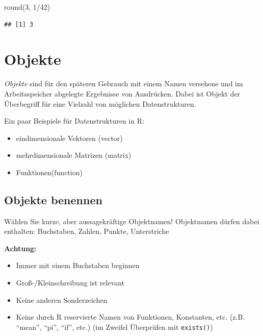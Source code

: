 \documentclass[
]{book}
\newenvironment{Shaded}{\begin{snugshade}}{\end{snugshade}}
\newcommand{\DecValTok}[1]{\textcolor[rgb]{0.00,0.00,0.81}{#1}}
\newcommand{\FunctionTok}[1]{\textcolor[rgb]{0.00,0.00,0.00}{#1}}
\newcommand{\NormalTok}[1]{#1}
\newcommand{\SpecialCharTok}[1]{\textcolor[rgb]{0.00,0.00,0.00}{#1}}
\providecommand{\tightlist}{%
  \setlength{\itemsep}{0pt}\setlength{\parskip}{0pt}}
\begin{document}
\begin{Shaded}
\begin{Highlighting}[]
\FunctionTok{round}\NormalTok{(}\DecValTok{3}\NormalTok{, }\DecValTok{1}\SpecialCharTok{/}\DecValTok{42}\NormalTok{)}
\end{Highlighting}
\end{Shaded}

\begin{verbatim}
## [1] 3
\end{verbatim}

\hypertarget{objekte}{%
\section{Objekte}\label{objekte}}

\emph{Objekte} sind für den späteren Gebrauch mit einem Namen versehene und im Arbeitsspeicher abgelegte Ergebnisse von Ausdrücken.
Dabei ist Objekt der Überbegriff für eine Vielzahl von möglichen Datenstrukturen.

Ein paar Beispiele für Datenstrukturen in R:

\begin{itemize}
\tightlist
\item
  eindimensionale Vektoren (vector)
\item
  mehrdimensionale Matrizen (matrix)
\item
  Funktionen(function)
\end{itemize}

\hypertarget{objekte-benennen}{%
\subsection*{Objekte benennen}\label{objekte-benennen}}

Wählen Sie kurze, aber aussagekräftige Objektnamen! Objektnamen dürfen dabei enthalten: Buchstaben, Zahlen, Punkte, Unterstriche

\textbf{Achtung:}

\begin{itemize}
\tightlist
\item
  Immer mit einem Buchstaben beginnen
\item
  Groß-/Kleinschreibung ist relevant
\item
  Keine anderen Sonderzeichen
\item
  Keine durch R reservierte Namen von Funktionen, Konstanten, etc. (z.B. ``mean'', ``pi'', ``if'', etc.) (im Zweifel Überprüfen mit \texttt{exists()})
\end{itemize}
\end{document}
